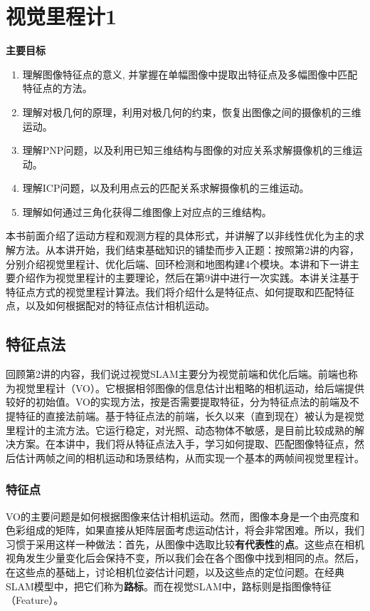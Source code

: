 \chapter{视觉里程计1}

\begin{mdframed}  
	\textbf{主要目标}
	\begin{enumerate}[labelindent=0em,leftmargin=1.5em]
		\item 理解图像特征点的意义, 并掌握在单幅图像中提取出特征点及多幅图像中匹配特征点的方法。
		\item 理解对极几何的原理，利用对极几何的约束，恢复出图像之间的摄像机的三维运动。
		\item 理解PNP问题，以及利用已知三维结构与图像的对应关系求解摄像机的三维运动。
		\item 理解ICP问题，以及利用点云的匹配关系求解摄像机的三维运动。
		\item 理解如何通过三角化获得二维图像上对应点的三维结构。
	\end{enumerate}
\end{mdframed}

本书前面介绍了运动方程和观测方程的具体形式，并讲解了以非线性优化为主的求解方法。从本讲开始，我们结束基础知识的铺垫而步入正题：按照第2讲的内容，分别介绍视觉里程计、优化后端、回环检测和地图构建4个模块。本讲和下一讲主要介绍作为视觉里程计的主要理论，然后在第9讲中进行一次实践。本讲关注基于特征点方式的视觉里程计算法。我们将介绍什么是特征点、如何提取和匹配特征点，以及如何根据配对的特征点估计相机运动。

\newpage


\newpage

\section{特征点法}
回顾第2讲的内容，我们说过视觉SLAM主要分为视觉前端和优化后端。前端也称为视觉里程计（VO）。它根据相邻图像的信息估计出粗略的相机运动，给后端提供较好的初始值。VO的实现方法，按是否需要提取特征，分为特征点法的前端及不提特征的直接法前端。基于特征点法的前端，长久以来（直到现在）被认为是视觉里程计的主流方法。它运行稳定，对光照、动态物体不敏感，是目前比较成熟的解决方案。在本讲中，我们将从特征点法入手，学习如何提取、匹配图像特征点，然后估计两帧之间的相机运动和场景结构，从而实现一个基本的两帧间视觉里程计。

\subsection{特征点}
VO的主要问题是如何根据图像来估计相机运动。然而，图像本身是一个由亮度和色彩组成的矩阵，如果直接从矩阵层面考虑运动估计，将会非常困难。所以，我们习惯于采用这样一种做法：首先，从图像中选取比较\textbf{有代表性}的\textbf{点}。这些点在相机视角发生少量变化后会保持不变，所以我们会在各个图像中找到相同的点。然后，在这些点的基础上，讨论相机位姿估计问题，以及这些点的定位问题。在经典SLAM模型中，把它们称为\textbf{路标}。而在视觉SLAM中，路标则是指图像特征（Feature）。

